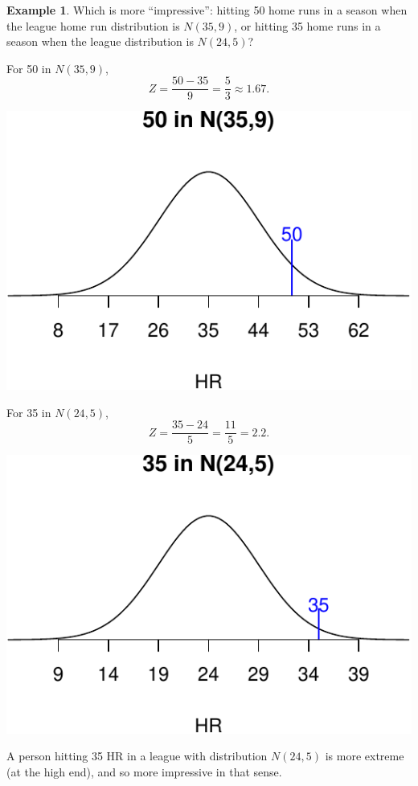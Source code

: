 \documentclass[
]{book}
\theoremstyle{definition}
\theoremstyle{definition}
\newtheorem{example}{Example}[chapter]
\theoremstyle{definition}
\theoremstyle{definition}
\theoremstyle{remark}
\begin{document}
\begin{example}
\protect\hypertarget{exm:comparing-values-with-z-scores}{}\label{exm:comparing-values-with-z-scores}Which is more ``impressive'': hitting 50 home runs in a season when the league home run distribution is \(N(35,9)\), or hitting 35 home runs in a season when the league distribution is \(N(24,5)\)?

For 50 in \(N(35,9)\), \[Z = \frac{50-35}{9} = \frac{5}{3} \approx 1.67.\]

\includegraphics{math340-notes_files/figure-latex/unnamed-chunk-20-1.pdf}

For 35 in \(N(24,5)\), \[Z = \frac{35-24}{5} = \frac{11}{5} = 2.2.\]

\includegraphics{math340-notes_files/figure-latex/unnamed-chunk-21-1.pdf}

A person hitting 35 HR in a league with distribution \(N(24,5)\) is more extreme (at the high end), and so more impressive in that sense.
\end{example}
\end{document}
